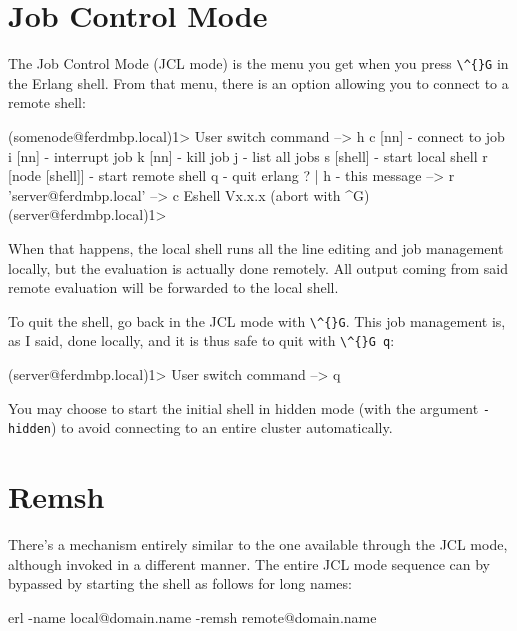 \documentclass[11pt, oneside]{book}   	%
\newcommand{\command}[1]{\Verb`#1`}
\begin{document}
\section{Job Control Mode}

The Job Control Mode (JCL mode) is the menu you get when you press \command{\^{}G} in the Erlang shell. From that menu, there is an option allowing you to connect to a remote shell:

\begin{VerbatimEshell}
(somenode@ferdmbp.local)1>
User switch command
 --> h
  c [nn]            - connect to job
  i [nn]            - interrupt job
  k [nn]            - kill job
  j                 - list all jobs
  s [shell]         - start local shell
  r [node [shell]]  - start remote shell
  q                 - quit erlang
  ? | h             - this message
 --> r 'server@ferdmbp.local'
 --> c
Eshell Vx.x.x  (abort with ^G)
(server@ferdmbp.local)1>
\end{VerbatimEshell}

When that happens, the local shell runs all the line editing and job management locally, but the evaluation is actually done remotely. All output coming from said remote evaluation will be forwarded to the local shell.

To quit the shell, go back in the JCL mode with \command{\^{}G}. This job management is, as I said, done locally, and it is thus safe to quit with \command{\^{}G q}:

\begin{VerbatimEshell}
(server@ferdmbp.local)1>
User switch command
 --> q
\end{VerbatimEshell}

You may choose to start the initial shell in hidden mode (with the argument \command{-hidden}) to avoid connecting to an entire cluster automatically.

\section{Remsh}

There's a mechanism entirely similar to the one available through the JCL mode, although invoked in a different manner. The entire JCL mode sequence can by bypassed by starting the shell as follows for long names:

\begin{VerbatimText}
erl -name local@domain.name -remsh remote@domain.name
\end{VerbatimText}
\end{document}

